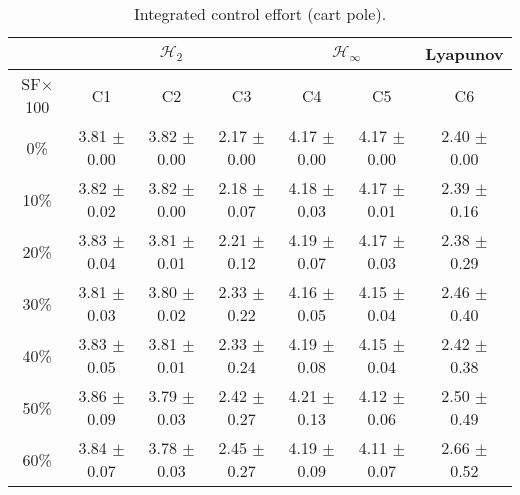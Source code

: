 \begin{table}[H]
\centering
\scriptsize
\begin{tabular}{| c || c | c | c | c | c | c |}
	\hline
	 & \multicolumn{3}{c|}{$\mathcal{H}_{2}$} & \multicolumn{2}{c|}{$\mathcal{H}_{\infty}$} & Lyapunov\\
	\hline
	SF$\times$100 & C1& C2 & C3 & C4 & C5 & C6\\
	\hline\hline
	0\% & 3.81 $\pm$ 0.00 & 3.82 $\pm$ 0.00 & 2.17 $\pm$ 0.00 & 4.17 $\pm$ 0.00 & 4.17 $\pm$ 0.00 & 2.40 $\pm$ 0.00\\
	\hline
	10\% & 3.82 $\pm$ 0.02 & 3.82 $\pm$ 0.00 & 2.18 $\pm$ 0.07 & 4.18 $\pm$ 0.03 & 4.17 $\pm$ 0.01 & 2.39 $\pm$ 0.16\\
	\hline
	20\% & 3.83 $\pm$ 0.04 & 3.81 $\pm$ 0.01 & 2.21 $\pm$ 0.12 & 4.19 $\pm$ 0.07 & 4.17 $\pm$ 0.03 & 2.38 $\pm$ 0.29\\
	\hline
	30\% & 3.81 $\pm$ 0.03 & 3.80 $\pm$ 0.02 & 2.33 $\pm$ 0.22 & 4.16 $\pm$ 0.05 & 4.15 $\pm$ 0.04 & 2.46 $\pm$ 0.40\\
	\hline
	40\% & 3.83 $\pm$ 0.05 & 3.81 $\pm$ 0.01 & 2.33 $\pm$ 0.24 & 4.19 $\pm$ 0.08 & 4.15 $\pm$ 0.04 & 2.42 $\pm$ 0.38\\
	\hline
	50\% & 3.86 $\pm$ 0.09 & 3.79 $\pm$ 0.03 & 2.42 $\pm$ 0.27 & 4.21 $\pm$ 0.13 & 4.12 $\pm$ 0.06 & 2.50 $\pm$ 0.49\\
	\hline
	60\% & 3.84 $\pm$ 0.07 & 3.78 $\pm$ 0.03 & 2.45 $\pm$ 0.27 & 4.19 $\pm$ 0.09 & 4.11 $\pm$ 0.07 & 2.66 $\pm$ 0.52\\
	\hline
\end{tabular}
\caption{Integrated control effort (cart pole).}
\label{table:control_effort_cart_pole:unc}
\end{table}

